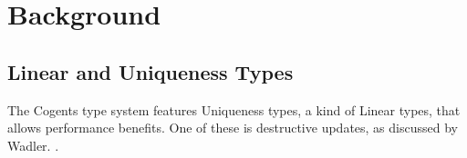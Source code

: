 \chapter{Background}\label{ch:background}

\section{Linear and Uniqueness Types}

The Cogents type system features Uniqueness types, a kind of Linear types, that allows performance benefits.
One of these is destructive updates, as discussed by Wadler. .


